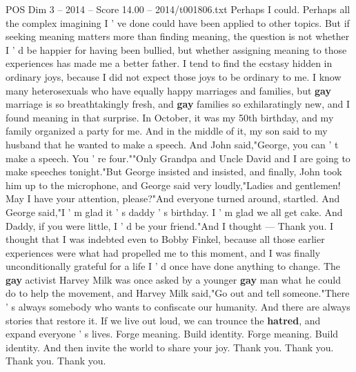 \begin{textsample}{POS Dim 3 – 2014 – Score 14.00 – 2014/t001806.txt}
Perhaps I could.
Perhaps all the complex imagining I ' ve done could have been applied to other topics.
But if seeking meaning matters more than finding meaning, the question is not whether I ' d be happier for having been bullied, but whether assigning meaning to those experiences has made me a better father.
I tend to find the ecstasy hidden in ordinary joys, because I did not expect those joys to be ordinary to me.
I know many heterosexuals who have equally happy marriages and families, but \textbf{gay} marriage is so breathtakingly fresh, and \textbf{gay} families so exhilaratingly new, and I found meaning in that surprise.
In October, it was my 50th birthday, and my family organized a party for me.
And in the middle of it, my son said to my husband that he wanted to make a speech.
And John said,"George, you can ' t make a speech.
You ' re four.""Only Grandpa and Uncle David and I are going to make speeches tonight."But George insisted and insisted, and finally, John took him up to the microphone, and George said very loudly,"Ladies and gentlemen!
May I have your attention, please?"And everyone turned around, startled.
And George said,"I ' m glad it ' s daddy ' s birthday.
I ' m glad we all get cake.
And Daddy, if you were little, I ' d be your friend."And I thought — Thank you.
I thought that I was indebted even to Bobby Finkel, because all those earlier experiences were what had propelled me to this moment, and I was finally unconditionally grateful for a life I ' d once have done anything to change.
The \textbf{gay} activist Harvey Milk was once asked by a younger \textbf{gay} man what he could do to help the movement, and Harvey Milk said,"Go out and tell someone."There ' s always somebody who wants to confiscate our humanity.
And there are always stories that restore it.
If we live out loud, we can trounce the \textbf{hatred}, and expand everyone ' s lives.
Forge meaning.
Build identity.
Forge meaning.
Build identity.
And then invite the world to share your joy.
Thank you.
Thank you.
Thank you.
Thank you.

\end{textsample}
